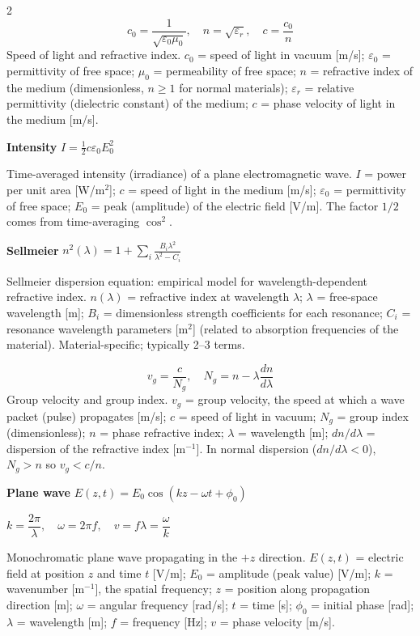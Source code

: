 \documentclass[9pt]{extarticle}
\newcommand{\eqlabel}[1]{\textbf{\scriptsize #1}\;}
\newcommand{\desc}[1]{{\small\color{desc}#1}}
\begin{document}
\begin{multicols}{2}
\[c_0 = \frac{1}{\sqrt{\varepsilon_0\mu_0}},\quad n = \sqrt{\varepsilon_r},\quad c = \frac{c_0}{n}\]
\desc{Speed of light and refractive index. $c_0$ = speed of light in vacuum [m/s]; $\varepsilon_0$ = permittivity of free space; $\mu_0$ = permeability of free space; $n$ = refractive index of the medium (dimensionless, $n \geq 1$ for normal materials); $\varepsilon_r$ = relative permittivity (dielectric constant) of the medium; $c$ = phase velocity of light in the medium [m/s].}

\eqlabel{Intensity} $I = \tfrac{1}{2}c\varepsilon_0 E_0^2$

\desc{Time-averaged intensity (irradiance) of a plane electromagnetic wave. $I$ = power per unit area [W/m$^2$]; $c$ = speed of light in the medium [m/s]; $\varepsilon_0$ = permittivity of free space; $E_0$ = peak (amplitude) of the electric field [V/m]. The factor $1/2$ comes from time-averaging $\cos^2$.}

\eqlabel{Sellmeier} $n^2(\lambda) = 1 + \displaystyle\sum_i\frac{B_i\lambda^2}{\lambda^2 - C_i}$

\desc{Sellmeier dispersion equation: empirical model for wavelength-dependent refractive index. $n(\lambda)$ = refractive index at wavelength $\lambda$; $\lambda$ = free-space wavelength [m]; $B_i$ = dimensionless strength coefficients for each resonance; $C_i$ = resonance wavelength parameters [m$^2$] (related to absorption frequencies of the material). Material-specific; typically 2--3 terms.}

\[v_g = \frac{c}{N_g},\quad N_g = n - \lambda\frac{dn}{d\lambda}\]
\desc{Group velocity and group index. $v_g$ = group velocity, the speed at which a wave packet (pulse) propagates [m/s]; $c$ = speed of light in vacuum; $N_g$ = group index (dimensionless); $n$ = phase refractive index; $\lambda$ = wavelength [m]; $dn/d\lambda$ = dispersion of the refractive index [m$^{-1}$]. In normal dispersion ($dn/d\lambda < 0$), $N_g > n$ so $v_g < c/n$.}

\eqlabel{Plane wave} $E(z,t) = E_0\cos(kz - \omega t + \phi_0)$

$k = \dfrac{2\pi}{\lambda},\quad \omega = 2\pi f,\quad v = f\lambda = \dfrac{\omega}{k}$

\desc{Monochromatic plane wave propagating in the $+z$ direction. $E(z,t)$ = electric field at position $z$ and time $t$ [V/m]; $E_0$ = amplitude (peak value) [V/m]; $k$ = wavenumber [m$^{-1}$], the spatial frequency; $z$ = position along propagation direction [m]; $\omega$ = angular frequency [rad/s]; $t$ = time [s]; $\phi_0$ = initial phase [rad]; $\lambda$ = wavelength [m]; $f$ = frequency [Hz]; $v$ = phase velocity [m/s].}


\end{multicols}
\end{document}
